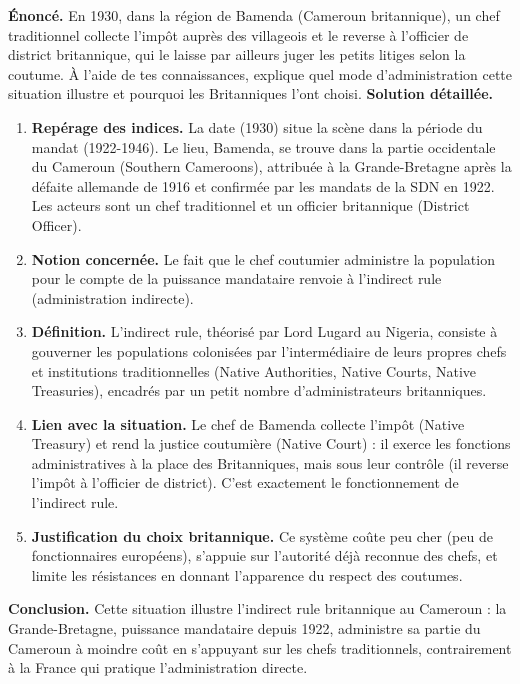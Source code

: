 \documentclass[11pt]{article}
\newcommand{\cle}[1]{{\popxbold\color{popdark}#1}}
\begin{document}
\begin{exoresolu}
\textbf{Énoncé.} En 1930, dans la région de Bamenda (Cameroun britannique), un chef traditionnel collecte l'impôt auprès des villageois et le reverse à l'officier de district britannique, qui le laisse par ailleurs juger les petits litiges selon la coutume. À l'aide de tes connaissances, explique quel mode d'administration cette situation illustre et pourquoi les Britanniques l'ont choisi.
\tcblower
\textbf{Solution détaillée.}
\begin{enumerate}
\item \textbf{Repérage des indices.} La date (1930) situe la scène dans la période du \cle{mandat} (1922-1946). Le lieu, Bamenda, se trouve dans la partie occidentale du Cameroun (Southern Cameroons), attribuée à la Grande-Bretagne après la défaite allemande de 1916 et confirmée par les mandats de la SDN en 1922. Les acteurs sont un chef traditionnel et un officier britannique (District Officer).
\item \textbf{Notion concernée.} Le fait que le chef coutumier administre la population pour le compte de la puissance mandataire renvoie à l'\cle{indirect rule} (administration indirecte).
\item \textbf{Définition.} L'indirect rule, théorisé par Lord Lugard au Nigeria, consiste à gouverner les populations colonisées par l'intermédiaire de leurs propres chefs et institutions traditionnelles (Native Authorities, Native Courts, Native Treasuries), encadrés par un petit nombre d'administrateurs britanniques.
\item \textbf{Lien avec la situation.} Le chef de Bamenda collecte l'impôt (Native Treasury) et rend la justice coutumière (Native Court) : il exerce les fonctions administratives à la place des Britanniques, mais sous leur contrôle (il reverse l'impôt à l'officier de district). C'est exactement le fonctionnement de l'indirect rule.
\item \textbf{Justification du choix britannique.} Ce système coûte peu cher (peu de fonctionnaires européens), s'appuie sur l'autorité déjà reconnue des chefs, et limite les résistances en donnant l'apparence du respect des coutumes.
\end{enumerate}
\textbf{Conclusion.} Cette situation illustre l'indirect rule britannique au Cameroun : la Grande-Bretagne, puissance mandataire depuis 1922, administre sa partie du Cameroun à moindre coût en s'appuyant sur les chefs traditionnels, contrairement à la France qui pratique l'administration directe.
\end{exoresolu}
\end{document}
